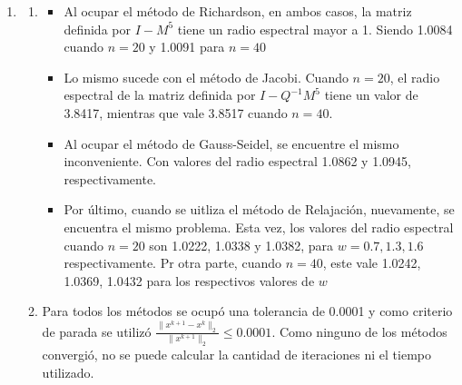 \documentclass{udpreport}
\providecommand{\norm}[1]{\lVert#1\rVert}
\begin{document}
\begin{enumerate}
\begin{enumerate}
     \end{enumerate}
 	\item 
 	\begin{enumerate}
 			\item \begin{itemize}
 				\item Al ocupar el método de Richardson, en ambos casos, la matriz definida por $I-M^5$ tiene un radio espectral mayor a 1. Siendo 1.0084 cuando $n=20$ y 1.0091 para $n=40$
 				\item Lo mismo sucede con el método de Jacobi. Cuando $n = 20$, el radio espectral de la matriz definida por $I-Q^{-1}M^5$ tiene un valor de 3.8417, mientras que vale 3.8517 cuando  $n=40$.
 				\item Al ocupar el método de Gauss-Seidel, se encuentre el mismo inconveniente. Con valores del radio espectral 1.0862 y 1.0945, respectivamente.
 				\item Por último, cuando se uitliza el método de Relajación, nuevamente, se encuentra el mismo problema. Esta vez, los valores del radio espectral cuando $n=20$ son 1.0222, 1.0338 y 1.0382, para $w=0.7, 1.3,1.6$ respectivamente. Pr otra parte, cuando $n=40$, este vale 1.0242, 1.0369, 1.0432 para los respectivos valores de $w$
 			\end{itemize}
 			\newpage
 			\item Para todos los métodos se ocupó una tolerancia de 0.0001 y como criterio de parada se utilizó $\frac{\norm{x^{k+1}-x^{k}}_{2}}{\norm{x^{k+1}}_{2}}\leq 0.0001$. 
 			Como ninguno de los métodos convergió, no se puede calcular la cantidad de iteraciones ni el tiempo utilizado.
 			

\end{enumerate}
\end{enumerate}
\end{document}
